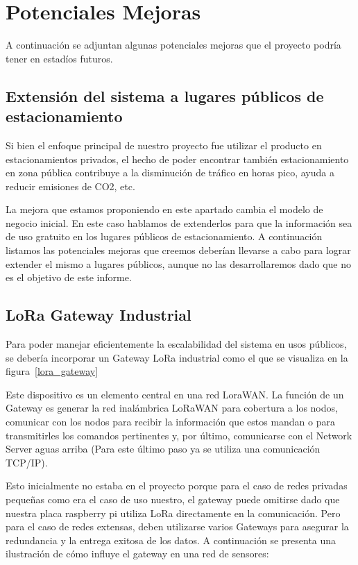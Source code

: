 \clearpage
\section{Potenciales Mejoras}
A continuación se adjuntan algunas potenciales mejoras que el proyecto podría tener en estadíos futuros.

\subsection{Extensión del sistema a lugares públicos de estacionamiento}

Si bien el enfoque principal de nuestro proyecto fue utilizar el producto en estacionamientos privados, el hecho de poder encontrar también estacionamiento en zona pública contribuye a la disminución de tráfico en horas pico, ayuda a reducir emisiones de CO2, etc.

La mejora que estamos proponiendo en este apartado cambia el modelo de negocio inicial. En este caso hablamos de extenderlos para que la información sea de uso gratuito en los lugares públicos de estacionamiento. A continuación listamos las potenciales mejoras que creemos deberían llevarse a cabo para lograr extender el mismo a lugares públicos, aunque no las desarrollaremos dado que no es el objetivo de este informe.

\subsection{LoRa Gateway Industrial}
Para poder manejar eficientemente la escalabilidad del sistema en usos públicos, se debería incorporar un Gateway LoRa industrial como el que se visualiza en la figura~\ref{lora_gateway}


Este dispositivo es un elemento central en una red LoraWAN. La función de un Gateway es generar la red inalámbrica LoRaWAN para cobertura a los nodos, comunicar con los nodos para recibir la información que estos mandan o para transmitirles los comandos pertinentes y, por último, comunicarse con el Network Server aguas arriba (Para este último paso ya se utiliza una comunicación TCP/IP).

Esto inicialmente no estaba en el proyecto porque para el caso de redes privadas pequeñas como era el caso de uso nuestro, el gateway puede omitirse dado que nuestra placa raspberry pi utiliza LoRa directamente en la comunicación. Pero para el caso de redes extensas, deben utilizarse varios Gateways para asegurar la redundancia y la entrega exitosa de los datos. A continuación se presenta una ilustración de cómo influye el gateway en una red de sensores:

